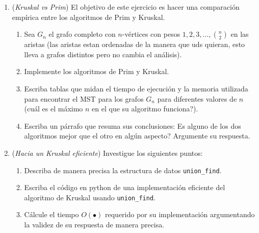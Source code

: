 \documentclass[12pt, a4paper]{article}
\begin{document}
\begin{enumerate}
\item ({\it Kruskal vs Prim}) El objetivo de este ejercicio es hacer una comparación empírica entre los algoritmos de Prim y Kruskal. 
\begin{enumerate}
\item Sea $G_n$ el grafo completo con $n$-vértices con pesos $1,2,3,\dots, \binom{n}{2}$ en las aristas (las aristas estan ordenadas de la manera que uds quieran, esto lleva a grafos distintos pero no cambia el análisis).
\item Implemente los algoritmos de Prim y Kruskal.
\item Escriba tablas que midan el tiempo de ejecución y la memoria utilizada para encontrar el MST para los grafos $G_n$ para diferentes valores de $n$ (cuál es el máximo $n$ en el que su algoritmo funciona?).
\item Escriba un párrafo que resuma sus conclusiones: Es alguno de los dos algoritmos mejor que el otro en algún aspecto? Argumente su respuesta.
\end{enumerate}

\item ({\it Hacia un Kruskal eficiente}) Investigue los siguientes puntos:
\begin{enumerate}
\item Describa de manera precisa la estructura de datos \verb!union_find!.
\item Escriba el código en python de una implementación eficiente del algoritmo de Kruskal usando \verb!union_find!.
\item Cálcule el tiempo $O(\bullet)$ requerido por su implementación argumentando la validez de su respuesta de manera precisa.
\end{enumerate}


\end{enumerate}
\end{document}
